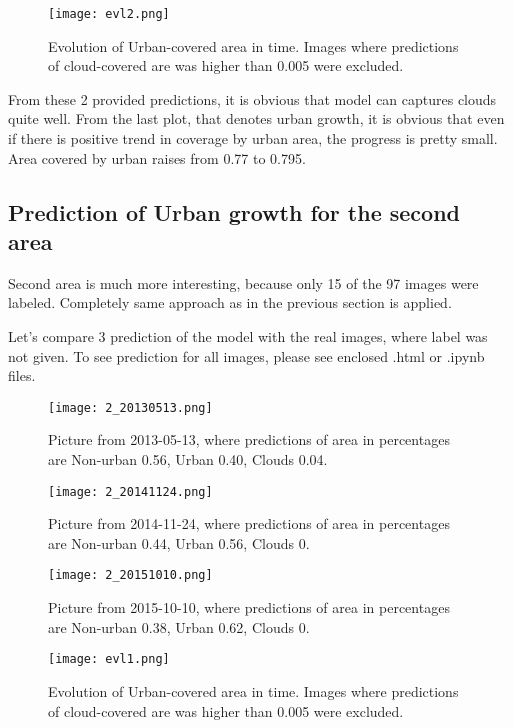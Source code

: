 \documentclass{homework}
\begin{document}
\begin{figure}[H]
\centering
\texttt{[image: evl2.png]}
\caption{Evolution of Urban-covered area in time. Images where predictions of cloud-covered are was higher than 0.005 were excluded. }
\centering
\end{figure}

From these 2 provided predictions, it is obvious that model can captures clouds quite well. From the last plot, that denotes urban growth, it is obvious that even if there is positive trend in coverage by urban area, the progress is pretty small. Area covered by urban raises from 0.77 to 0.795.


\subsection{Prediction of Urban growth for the second area}
Second area is much more interesting, because only 15 of the 97 images were labeled. Completely same approach as in the previous section is applied.

Let's compare 3 prediction of the model with the real images, where label was not given.
To see prediction for all images, please see enclosed .html or .ipynb files.

\begin{figure}[H]
\centering
\texttt{[image: 2\_20130513.png]}
\caption{Picture from 2013-05-13, where predictions of area in percentages are Non-urban 0.56, Urban 0.40, Clouds 0.04.}
\centering
\end{figure}

\begin{figure}[H]
\centering
\texttt{[image: 2\_20141124.png]}
\caption{Picture from 2014-11-24, where predictions of area in percentages are Non-urban 0.44, Urban 0.56, Clouds 0.}
\centering
\end{figure}

\begin{figure}[H]
\centering
\texttt{[image: 2\_20151010.png]}
\caption{Picture from 2015-10-10, where predictions of area in percentages are Non-urban 0.38, Urban 0.62, Clouds 0.}
\centering
\end{figure}

\begin{figure}[H]
\centering
\texttt{[image: evl1.png]}
\caption{Evolution of Urban-covered area in time. Images where predictions of cloud-covered are was higher than 0.005 were excluded. }
\centering
\end{figure}
\end{document}
